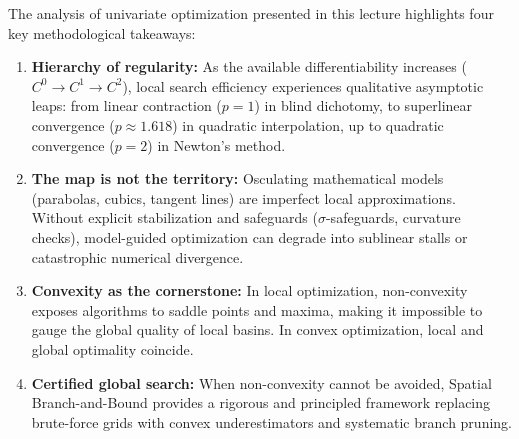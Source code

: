 The analysis of univariate optimization presented in this lecture highlights four key methodological takeaways:
\begin{enumerate}
    \item \textbf{Hierarchy of regularity:} As the available differentiability increases ($C^0 \to C^1 \to C^2$), local search efficiency experiences qualitative asymptotic leaps: from linear contraction ($p = 1$) in blind dichotomy, to superlinear convergence ($p \approx 1.618$) in quadratic interpolation, up to quadratic convergence ($p = 2$) in Newton's method.
    \item \textbf{The map is not the territory:} Osculating mathematical models (parabolas, cubics, tangent lines) are imperfect local approximations. Without explicit stabilization and safeguards ($\sigma$-safeguards, curvature checks), model-guided optimization can degrade into sublinear stalls or catastrophic numerical divergence.
    \item \textbf{Convexity as the cornerstone:} In local optimization, non-convexity exposes algorithms to saddle points and maxima, making it impossible to gauge the global quality of local basins. In convex optimization, local and global optimality coincide.
    \item \textbf{Certified global search:} When non-convexity cannot be avoided, Spatial Branch-and-Bound provides a rigorous and principled framework replacing brute-force grids with convex underestimators and systematic branch pruning.
\end{enumerate}
